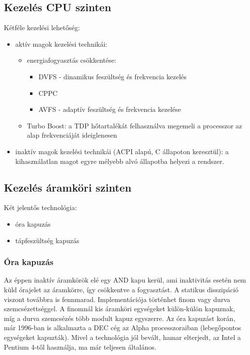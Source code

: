 \subsection{Kezelés CPU szinten}
Kétféle kezelési lehetőség:
\begin{itemize}
    \item aktív magok kezelési technikái:
    \begin{itemize}
        \item energiafogyasztás csökkentése:
        \begin{itemize}
            \item DVFS - dinamikus feszültség és frekvencia kezelés
            \item CPPC
            \item AVFS - adaptív feszültség és frekvencia kezelése
        \end{itemize}
        \item Turbo Boost: a TDP hőtartalékát felhasználva megemeli a processzor az alap frekvenciáját ideiglenesen
    \end{itemize}
    \item inaktív magok kezelési technikái (ACPI alapú, C állapoton keresztül): a kihasználatlan magot egyre mélyebb alvó állapotba helyezi a rendszer.
\end{itemize}

\subsection{Kezelés áramköri szinten}
Két jelentős technológia:
\begin{itemize}
    \item óra kapuzás
    \item tápfeszültség kapuzás
\end{itemize}

\subsubsection{Óra kapuzás}
Az éppen inaktív áramkörök elé egy AND kapu kerül, ami inaktivitás esetén nem küld órajelet az áramkörre, így csökkentve a fogyasztást.
A statikus disszipáció viszont továbbra is fennmarad.
Implementációja történhet finom vagy durva szemcsézettséggel.
A finomnál kis áramköri egységeket külön-külön kapuznak, míg a durva szemcsézés több modult kapuz egyszerre.
Az óra kapuzást korán, már 1996-ban is alkalmazta a DEC cég az Alpha processzoraiban (lebegőpontos egységeket kapuzták).
Mivel a technológia jól bevált, hamar elterjedt, az Intel a Pentium 4-től használja, ma már teljesen általános.

